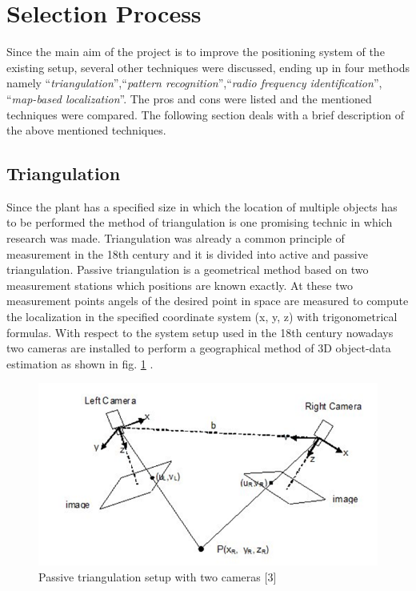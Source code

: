 \section{Selection Process} \label{Sec_selectionp}

Since the main aim of the project is to improve the positioning system of the existing setup, several  other techniques were discussed, ending up in four methods namely ``\textit{triangulation}'',``\textit{pattern recognition}'',``\textit{radio frequency identification}'', ``\textit{map-based localization}''. The pros and cons were listed and the mentioned techniques were compared. The following section deals with a brief description of the above mentioned techniques.\\

\subsection{Triangulation} %
Since the plant has a specified size in which the location of multiple objects has to be performed the method of triangulation is one promising technic in which research was made. 
Triangulation was already a common principle of measurement in the 18th century and it is divided into active and passive triangulation. Passive triangulation is a geometrical method based on two measurement stations which positions are known exactly. At these two measurement points angels of the desired point in space are measured to compute the localization in the specified coordinate system (x, y, z) with trigonometrical formulas.
With respect to the system setup used in the 18th century nowadays two cameras are installed to perform a geographical method of 3D object-data estimation as shown in fig. \ref{Triangulation} \cite{Prinzip3DVideometrie.}.
\begin{figure}[!htbp]
\centering
\includegraphics[width = 16cm]{Pictures/Triangulation}
\caption{Passive triangulation setup with two cameras [3]}
\label{Triangulation}
\end{figure}\\
